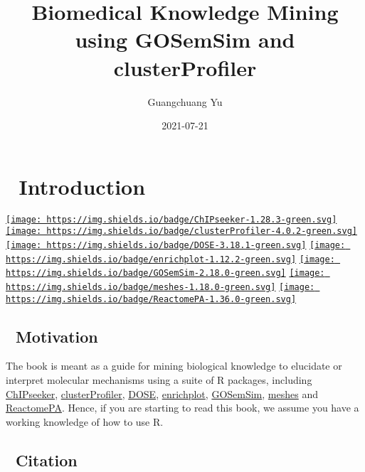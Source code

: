 \documentclass[
  12pt,
  a4paper,
  twoside]{book}
\title{Biomedical Knowledge Mining using GOSemSim and clusterProfiler}
\author{Guangchuang Yu}
\date{2021-07-21}
\begin{document}
\maketitle

{
\setcounter{tocdepth}{2}
\tableofcontents
}
\hypertarget{introduction}{%
\chapter*{📖 Introduction}\label{introduction}}

\href{https://github.com/YuLab-SMU/ChIPseeker}{\texttt{[image: https://img.shields.io/badge/ChIPseeker-1.28.3-green.svg]}}
\href{https://github.com/YuLab-SMU/clusterProfiler}{\texttt{[image: https://img.shields.io/badge/clusterProfiler-4.0.2-green.svg]}}
\href{https://github.com/YuLab-SMU/DOSE}{\texttt{[image: https://img.shields.io/badge/DOSE-3.18.1-green.svg]}}
\href{https://github.com/YuLab-SMU/enrichplot}{\texttt{[image: https://img.shields.io/badge/enrichplot-1.12.2-green.svg]}}
\href{https://github.com/YuLab-SMU/GOSemSim}{\texttt{[image: https://img.shields.io/badge/GOSemSim-2.18.0-green.svg]}}
\href{https://github.com/YuLab-SMU/meshes}{\texttt{[image: https://img.shields.io/badge/meshes-1.18.0-green.svg]}}
\href{https://github.com/YuLab-SMU/ReactomePA}{\texttt{[image: https://img.shields.io/badge/ReactomePA-1.36.0-green.svg]}}

\hypertarget{motivation}{%
\section*{🎯 Motivation}\label{motivation}}

The book is meant as a guide for mining biological knowledge to elucidate or interpret molecular mechanisms using a suite of R packages, including \href{http://bioconductor.org/packages/ChIPseeker}{ChIPseeker}, \href{http://bioconductor.org/packages/clusterProfiler}{clusterProfiler}, \href{http://bioconductor.org/packages/DOSE}{DOSE}, \href{http://bioconductor.org/packages/enrichplot}{enrichplot}, \href{http://bioconductor.org/packages/GOSemSim}{GOSemSim}, \href{http://bioconductor.org/packages/meshes}{meshes} and \href{http://bioconductor.org/packages/ReactomePA}{ReactomePA}. Hence, if you are starting to read this book, we assume you have a working knowledge of how to use R.

\hypertarget{citation}{%
\section*{📝 Citation}\label{citation}}
\end{document}
